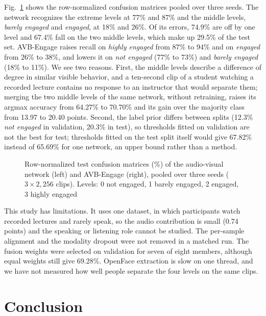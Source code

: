 \documentclass[pdflatex,iicol,sn-basic]{sn-jnl}
\newcommand{\ournet}{AVB-Engage}
\begin{document}
Fig.~\ref{fig:confusion} shows the row-normalized confusion matrices pooled over three seeds. The network recognizes the extreme levels at 77\% and 87\% and the middle levels, \emph{barely engaged} and \emph{engaged}, at 18\% and 26\%. Of its errors, 74.9\% are off by one level and 67.4\% fall on the two middle levels, which make up 29.5\% of the test set. \ournet{} raises recall on \emph{highly engaged} from 87\% to 94\% and on \emph{engaged} from 26\% to 38\%, and lowers it on \emph{not engaged} (77\% to 73\%) and \emph{barely engaged} (18\% to 11\%). We see two reasons. First, the middle levels describe a difference of degree in similar visible behavior, and a ten-second clip of a student watching a recorded lecture contains no response to an instructor that would separate them; merging the two middle levels of the same network, without retraining, raises its argmax accuracy from 64.27\% to 70.70\% and its gain over the majority class from 13.97 to 20.40 points. Second, the label prior differs between splits (12.3\% \emph{not engaged} in validation, 20.3\% in test), so thresholds fitted on validation are not the best for test; thresholds fitted on the test split itself would give 67.82\% instead of 65.69\% for one network, an upper bound rather than a method.

\begin{figure}[t]
\centering

\caption{Row-normalized test confusion matrices (\%) of the audio-visual network (left) and \ournet{} (right), pooled over three seeds ($3 \times 2{,}256$ clips). Levels: 0 not engaged, 1 barely engaged, 2 engaged, 3 highly engaged}
\label{fig:confusion}
\end{figure}

This study has limitations. It uses one dataset, in which participants watch recorded lectures and rarely speak, so the audio contribution is small (0.74 points) and the speaking or listening role cannot be studied. The per-sample alignment and the modality dropout were not removed in a matched run. The fusion weights were selected on validation for seven of eight members, although equal weights still give 69.28\%. OpenFace extraction is slow on one thread, and we have not measured how well people separate the four levels on the same clips.

\section{Conclusion}\label{sec:conclusion}
\end{document}
